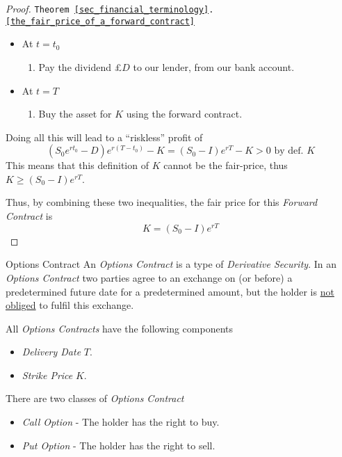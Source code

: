 \documentclass[11pt,a4paper]{article}
\begin{document}
\begin{proof}{\texttt{Theorem \ref{sec_financial_terminology}.\ref{the_fair_price_of_a_forward_contract}}}
\begin{itemize}
\begin{enumerate}
        \item Short sell the underlying asset. (Receiving £$S_0$).
        \item Invest this revenue, receiving an interest rate of $r$.
        \item Take a long position on the forward contract.
      \end{enumerate}
      \item At $t=t_0$
      \begin{enumerate}
        \item Pay the dividend £$D$ to our lender, from our bank account.
      \end{enumerate}
      \item At $t=T$
      \begin{enumerate}
        \item Buy the asset for $K$ using the forward contract.
      \end{enumerate}
    \end{itemize}
    \par Doing all this will lead to a ``riskless'' profit of
    \[ (S_0e^{rt_0}-D)e^{r(T-t_0)}-K=(S_0-I)e^{rT}-K>0\text{ by def. }K \]
    This means that this definition of $K$ cannot be the fair-price, thus $K\geq(S_0-I)e^{rT}$.
    \par Thus, by combining these two inequalities, the fair price for this \textit{Forward Contract} is
    \[ K=(S_0-I)e^{rT} \]
  \end{proof}

  \begin{definition}{Options Contract}
    An \textit{Options Contract} is a type of \textit{Derivative Security}. In an \textit{Options Contract} two parties agree to an exchange on (or before) a predetermined future date for a predetermined amount, but the holder is \underline{not obliged} to fulfil this exchange.
    \par All \textit{Options Contracts} have the following components
    \begin{itemize}
      \item \textit{Delivery Date} $T$.
      \item \textit{Strike Price} $K$.
    \end{itemize}
    There are two classes of \textit{Options Contract}
    \begin{itemize}
      \item \textit{Call Option} - The holder has the right to buy.
      \item \textit{Put Option} - The holder has the right to sell.
    \end{itemize}
  \end{definition}
\end{document}
